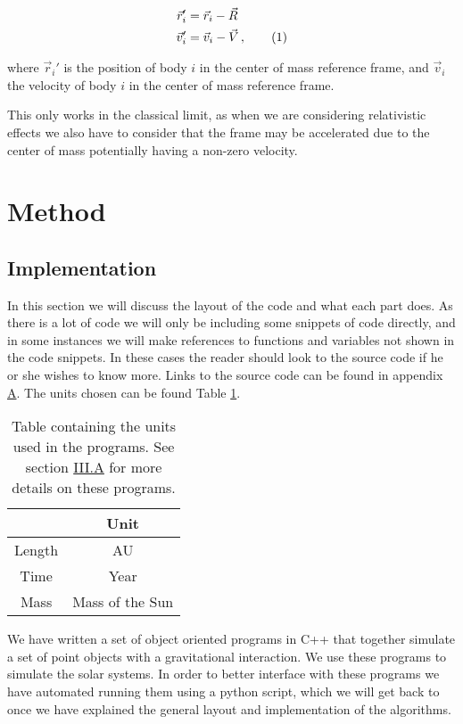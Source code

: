 \documentclass[reprint,english,notitlepage]{revtex4-1}  %
\newcommand\numberthis{\addtocounter{equation}{1}\tag{\theequation}}
\begin{document}
\begin{align*}
\vec{r}_i' &= \vec{r}_i - \vec{R} \\
\vec{v}_i' &= \vec{v}_i - \vec{V} \, , \numberthis \label{eq:cofm_transform}
\end{align*}

where $\vec{r}_i'$ is the position of body $i$ in the center of mass reference frame, and $\vec{v}_i$ the velocity of body $i$ in the center of mass reference frame.

This only works in the classical limit, as when we are considering relativistic effects we also have to consider that the frame may be accelerated due to the center of mass potentially having a non-zero velocity.
\newpage \newpage



\section{Method} \label{sec:III}

\subsection{Implementation} \label{sec:III:a}

In this section we will discuss the layout of the code and what each part does. As there is a lot of code we will only be including some snippets of code directly, and in some instances we will make references to functions and variables not shown in the code snippets. In these cases the reader should look to the source code if he or she wishes to know more. Links to the source code can be found in appendix \hyperref[A]{A}. The units chosen can be found Table \hyperref[table:III:a:i]{1}.

\begin{table}[h!] \label{table:III:a:i}
\caption{Table containing the units used in the programs. See section \hyperref[sec:III:a]{III.A} for more details on these programs.}
\begin{tabular}{|c|c|}
\hline
 & Unit \\
\hline
Length & AU \\
Time & Year \\
Mass & Mass of the Sun \\
\hline
\end{tabular}
\end{table}

We have written a set of object oriented programs in C++ that together simulate a set of point objects with a gravitational interaction. We use these programs to simulate the solar systems. In order to better interface with these programs we have automated running them using a python script, which we will get back to once we have explained the general layout and implementation of the algorithms. 
\end{document}
